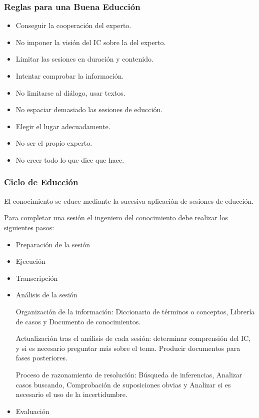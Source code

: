 \documentclass[12pt, twoside, openright]{report} %
\begin{document}
\subsubsection{Reglas para una Buena Educción}
\begin{itemize}
	\item Conseguir la cooperación del experto.
	\item No imponer la visión del IC sobre la del experto.
	\item Limitar las sesiones en duración y contenido.
	\item Intentar comprobar la información.
	\item No limitarse al diálogo, usar textos.
	\item No espaciar demasiado las sesiones de educción.
	\item Elegir el lugar adecuadamente.
	\item No ser el propio experto.
	\item No creer todo lo que dice que hace.
\end{itemize}

\subsubsection{Ciclo de Educción}
El conocimiento se educe mediante la sucesiva aplicación de sesiones de educción.

Para completar una sesión el ingeniero del conocimiento debe realizar los siguientes pasos:
\begin{itemize}
	\item Preparación de la sesión
	\item Ejecución
	\item Transcripción
	\item Análisis de la sesión
	      
	      Organización de la información: Diccionario de términos o conceptos, Librería de casos y Documento de conocimientos.
	      
	      Actualización tras el análisis de cada sesión: determinar comprensión del IC, y si es necesario preguntar más sobre el tema. Producir documentos para fases posteriores.
	      
	      Proceso de razonamiento de resolución: Búsqueda de inferencias, Analizar casos buscando, Comprobación de suposiciones obvias y Analizar si es necesario el uso de la incertidumbre.
	\item Evaluación
\end{itemize}
\end{document}
